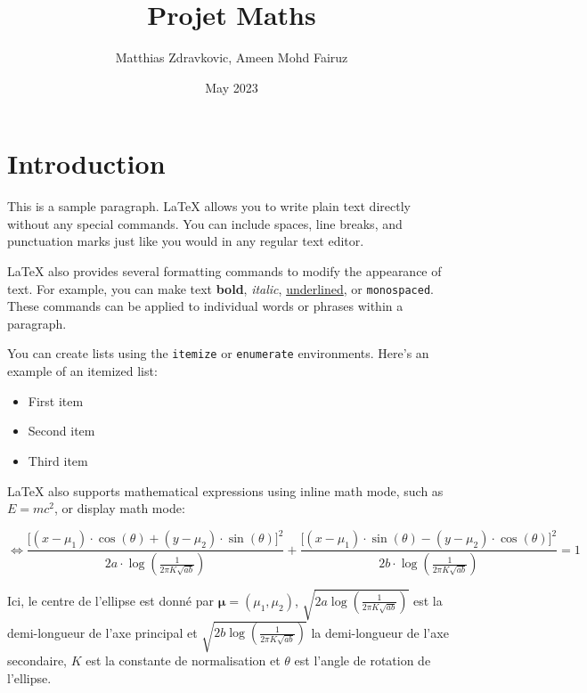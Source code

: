 \documentclass{article}
\title{Projet Maths}
\author{Matthias Zdravkovic, Ameen Mohd Fairuz}
\date{May 2023}
\begin{document}
\maketitle

\section{Introduction}

This is a sample paragraph. LaTeX allows you to write plain text directly without any special commands. You can include spaces, line breaks, and punctuation marks just like you would in any regular text editor.

LaTeX also provides several formatting commands to modify the appearance of text. For example, you can make text \textbf{bold}, \textit{italic}, \underline{underlined}, or \texttt{monospaced}. These commands can be applied to individual words or phrases within a paragraph.

You can create lists using the \texttt{itemize} or \texttt{enumerate} environments. Here's an example of an itemized list:

\begin{itemize}
    \item First item
    \item Second item
    \item Third item
\end{itemize}

LaTeX also supports mathematical expressions using inline math mode, such as $E = mc^2$, or display math mode:

\[
    \Leftrightarrow \frac{{[(x - \mu_1) \cdot \cos(\theta) + (y - \mu_2) \cdot \sin(\theta)}]^2}{{2a \cdot \log(\frac{1}{2\pi K \sqrt{ab}})}} + \frac{{[(x - \mu_1) \cdot \sin(\theta)-(y - \mu_2) \cdot \cos(\theta)}]^2}{{2b \cdot \log(\frac{1}{2\pi K \sqrt{ab}})}} = 1
\]

Ici, le centre de l'ellipse est donné par $\mathbf{\mu} = (\mu_1, \mu_2)$, $\sqrt{2a \log(\frac{1}{2\pi K \sqrt{ab}})}$ est la demi-longueur de l'axe principal et $\sqrt{2b \log(\frac{1}{2\pi K \sqrt{ab}})}$ la demi-longueur de l'axe secondaire, $K$ est la constante de normalisation et $\theta$ est l'angle de rotation de l'ellipse.
\end{document}
